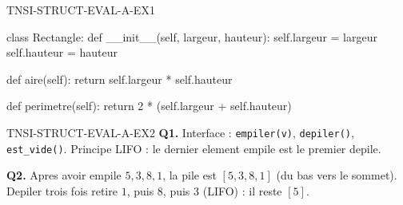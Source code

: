 \begin{corrige}{TNSI-STRUCT-EVAL-A-EX1}
\begin{python}
class Rectangle:
    def __init__(self, largeur, hauteur):
        self.largeur = largeur
        self.hauteur = hauteur

    def aire(self):
        return self.largeur * self.hauteur

    def perimetre(self):
        return 2 * (self.largeur + self.hauteur)
\end{python}
\end{corrige}

\begin{corrige}{TNSI-STRUCT-EVAL-A-EX2}
\textbf{Q1.} Interface : \lstinline{empiler(v)}, \lstinline{depiler()}, \lstinline{est_vide()}. Principe LIFO : le dernier element empile est le premier depile.

\textbf{Q2.} Apres avoir empile $5,3,8,1$, la pile est $[5,3,8,1]$ (du bas vers le sommet). Depiler trois fois retire $1$, puis $8$, puis $3$ (LIFO) : il reste $[5]$.
\end{corrige}
